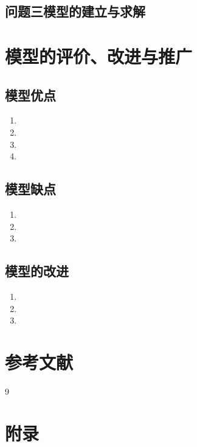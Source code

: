 \documentclass[15.75pt,a4paper]{ctexbook}
\theoremstyle{definition}
\begin{document}
	\subsection{问题三模型的建立与求解}
	
	
	\section{模型的评价、改进与推广}
	\subsection{模型优点}
	\begin{enumerate}
		\item 
		\item 
		\item 
		\item 
	\end{enumerate}
	
	\subsection{模型缺点}
	\begin{enumerate}
		\item 
		\item 
		\item 
	\end{enumerate}
	
	\subsection{模型的改进}
	\begin{enumerate}
		\item 
		\item 
		\item 
	\end{enumerate}
	
	\section{参考文献}
	\vspace{-2em} %
	\begin{thebibliography}{9}  
	\end{thebibliography}
	
	\newpage
	\section*{附录}
	
\end{document}
